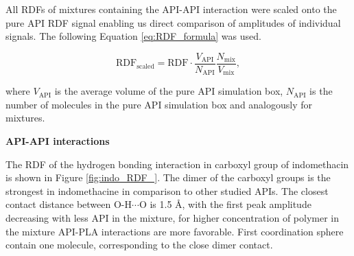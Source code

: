 All RDFs of mixtures containing the API-API interaction were scaled onto the pure API RDF signal enabling us direct comparison of amplitudes of individual signals. The following Equation \ref{eq:RDF_formula} was used.\vspace{-0.5cm}

\begin{equation}\label{eq:RDF_formula}
	\text{RDF}_{\text{scaled}} = \text{RDF} \cdot \frac{V_{\text{API}}}{N_{\text{API}}} \frac{N_{\text{mix}}}{V_{\text{mix}}},
\end{equation}

\vspace{-0.2cm}

where $V_{\text{API}}$ is the average volume of the pure API simulation box, $N_{\text{API}}$ is the number of molecules in the pure API simulation box and analogously for mixtures.

\newpage
\textbf{API-API interactions}

The RDF of the hydrogen bonding interaction in carboxyl group of indomethacin is shown in Figure \ref{fig:indo_RDF_}. The dimer of the carboxyl groups is the strongest in indomethacine in comparison to other studied APIs. The closest contact distance between O-H$\cdots$O is 1.5 \AA, with the first peak amplitude decreasing with less API in the mixture, for higher concentration of polymer in the mixture API-PLA interactions are more favorable. First coordination sphere contain one molecule, corresponding to the close dimer contact.

